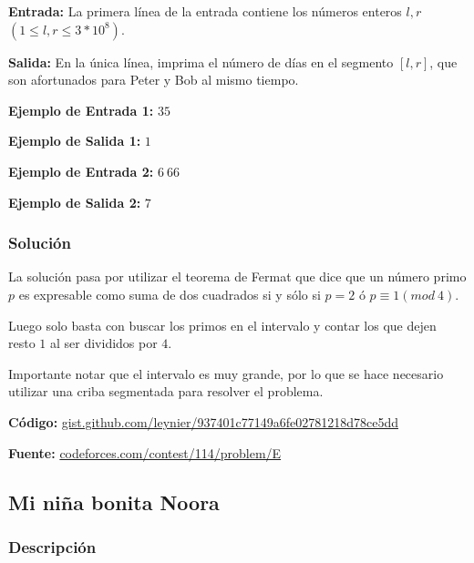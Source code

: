 \documentclass[12pt]{article}
\newcommand{\nl}{\vspace{0.3cm}}
\begin{document}
\nl

\textbf{Entrada:} La primera línea de la entrada contiene los números enteros $l, r$ $(1 \leqslant l, r \leqslant 3 * 10^8)$.

\nl

\textbf{Salida:} En la única línea, imprima el número de días en el segmento $[l, r]$, que son afortunados para Peter y Bob al mismo tiempo.

\newpage

\textbf{Ejemplo de Entrada 1:} $3 5$

\nl

\textbf{Ejemplo de Salida 1:} $1$

\nl

\textbf{Ejemplo de Entrada 2:} $6\ 66$

\nl

\textbf{Ejemplo de Salida 2:} $7$

\nl

\subsubsection{Solución}

La solución pasa por utilizar el teorema de Fermat\cite{oftst} que dice que un número primo $p$ es expresable como suma de dos cuadrados si y sólo si $p = 2$ ó $p \equiv 1 (mod\ 4)$.

\nl

Luego solo basta con buscar los primos en el intervalo y contar los que dejen resto $1$ al ser divididos por $4$.

\nl

Importante notar que el intervalo es muy grande, por lo que se hace necesario utilizar una criba segmentada para resolver el problema.

\nl

\textbf{Código:} \href{https://gist.github.com/leynier/937401c77149a6fe02781218d78ce5dd}{gist.github.com/leynier/937401c77149a6fe02781218d78ce5dd}

\nl

\textbf{Fuente:} \href{https://codeforces.com/contest/114/problem/E}{codeforces.com/contest/114/problem/E}

\subsection{Mi niña bonita Noora}

\subsubsection{Descripción}
\end{document}
